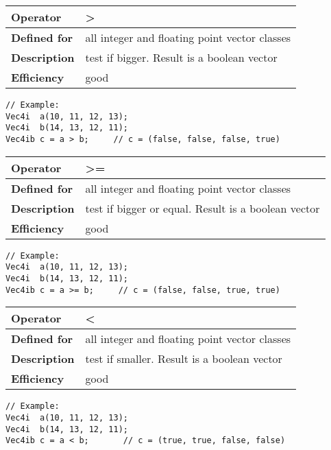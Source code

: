 \documentclass[vcl_manual.tex]{subfiles}
\begin{document}
\begin{tabular}{|p{25mm}|p{100mm}|}
\hline
\bfseries Operator & \textgreater \\ \hline
\bfseries Defined for & all integer and floating point vector classes \\ \hline
\bfseries Description & test if bigger. Result is a boolean vector \\ \hline
\bfseries Efficiency & good \\ \hline
\end{tabular}
\begin{lstlisting}[frame=none]
// Example:
Vec4i  a(10, 11, 12, 13);
Vec4i  b(14, 13, 12, 11);
Vec4ib c = a > b;     // c = (false, false, false, true)
\end{lstlisting}


\begin{tabular}{|p{25mm}|p{100mm}|}
\hline
\bfseries Operator & \textgreater= \\ \hline
\bfseries Defined for & all integer and floating point vector classes \\ \hline
\bfseries Description & test if bigger or equal. Result is a boolean vector \\ \hline
\bfseries Efficiency & good \\ \hline
\end{tabular}
\begin{lstlisting}[frame=none]
// Example:
Vec4i  a(10, 11, 12, 13);
Vec4i  b(14, 13, 12, 11);
Vec4ib c = a >= b;     // c = (false, false, true, true)
\end{lstlisting}


\begin{tabular}{|p{25mm}|p{100mm}|}
\hline
\bfseries Operator & \textless \\ \hline
\bfseries Defined for & all integer and floating point vector classes \\ \hline
\bfseries Description & test if smaller. Result is a boolean vector \\ \hline
\bfseries Efficiency & good \\ \hline
\end{tabular}
\begin{lstlisting}[frame=none]
// Example:
Vec4i  a(10, 11, 12, 13);
Vec4i  b(14, 13, 12, 11);
Vec4ib c = a < b;       // c = (true, true, false, false)
\end{lstlisting}
\end{document}

